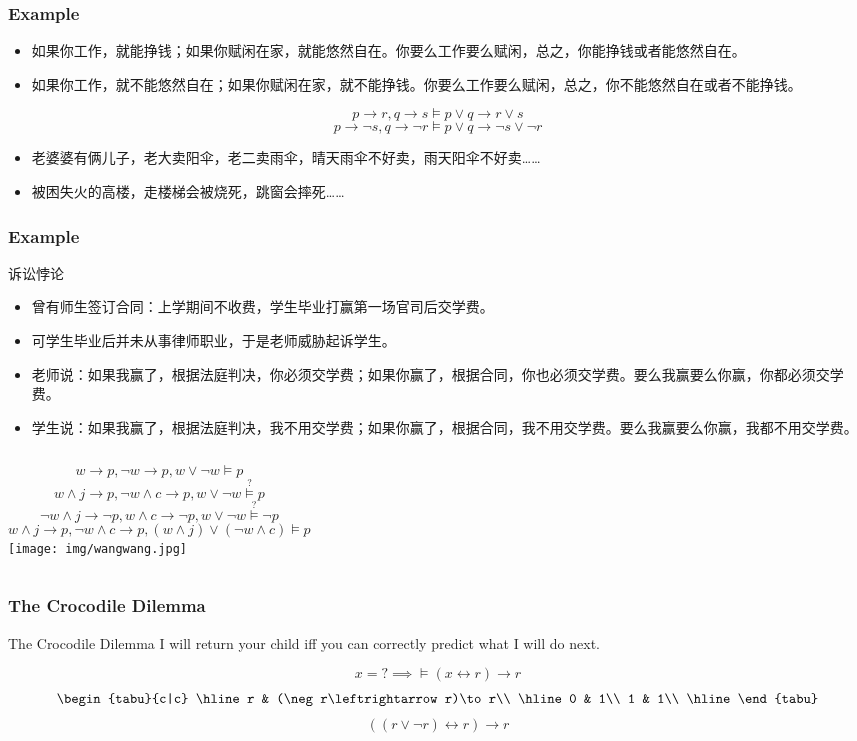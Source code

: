 \documentclass[UTF8,aspectratio=43,11pt,colorlinks,compress,openany]{beamer}%
\begin{document}
\begin{frame}\frametitle{Example}
	\begin{block}{}
	\begin{itemize}
		\item 如果你工作，就能挣钱；如果你赋闲在家，就能悠然自在。你要么工作要么赋闲，总之，你能挣钱或者能悠然自在。
		\item 如果你工作，就不能悠然自在；如果你赋闲在家，就不能挣钱。你要么工作要么赋闲，总之，你不能悠然自在或者不能挣钱。
	\end{itemize}
	\end{block}
	\[p\to r, q\to s\vDash p\vee q\to r\vee s\]
	\[p\to\neg s, q\to\neg r\vDash p\vee q\to\neg s\vee\neg r\]
\begin{itemize}
	\item 老婆婆有俩儿子，老大卖阳伞，老二卖雨伞，晴天雨伞不好卖，雨天阳伞不好卖……
	\item 被困失火的高楼，走楼梯会被烧死，跳窗会摔死……
\end{itemize}
\end{frame}

\begin{frame}\frametitle{Example}
	\begin{block}{诉讼悖论}\small
		\begin{itemize}
			\item 曾有师生签订合同：上学期间不收费，学生毕业打赢第一场官司后交学费。
			\item 可学生毕业后并未从事律师职业，于是老师威胁起诉学生。
			\item 老师说：如果我赢了，根据法庭判决，你必须交学费；如果你赢了，根据合同，你也必须交学费。要么我赢要么你赢，你都必须交学费。
			\item 学生说：如果我赢了，根据法庭判决，我不用交学费；如果你赢了，根据合同，我不用交学费。要么我赢要么你赢，我都不用交学费。
		\end{itemize}
	\end{block}
\begin{columns}
	\[w\to p, \neg w\to p, w\vee\neg w\vDash p\]
	\[w\wedge j\to p, \neg w\wedge c\to p, w\vee\neg w\stackrel{?}{\vDash} p\]
	\[\neg w\wedge j\to\neg p, w\wedge c\to\neg p, w\vee\neg w\stackrel{?}{\vDash}\neg p\]
	\[w\wedge j\to p, \neg w\wedge c\to p, (w\wedge j)\vee(\neg w\wedge c)\vDash p\]
\texttt{[image: img/wangwang.jpg]}
\end{columns}
\end{frame}

\begin{frame}\frametitle{The Crocodile Dilemma}
	\begin{block}{The Crocodile Dilemma}
		I will return your child iff you can correctly predict what I will do next.
	\end{block}
	\[x=?\implies \vDash(x\leftrightarrow r)\to r\]
	\[
		\begin{tabu}{c|c}
		\hline
		r & (\neg r\leftrightarrow r)\to r\\
		\hline
		0 & 1\\
		1 & 1\\
		\hline
		\end{tabu}
	\]
	\[((r\vee\neg r)\leftrightarrow r)\to r\]
\end{frame}
\end{document}
